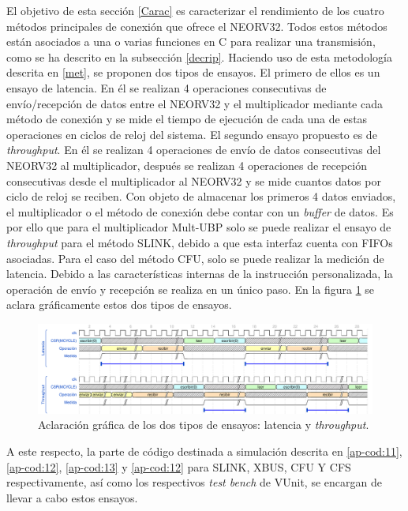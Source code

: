 El objetivo de esta sección \ref{Carac} es caracterizar el rendimiento de los cuatro métodos principales de conexión que ofrece el NEORV32.
Todos estos métodos están asociados a una o varias funciones en C para realizar una transmisión, como se ha descrito en la subsección \ref{decrip}.
Haciendo uso de esta metodología descrita en \ref{met}, se proponen dos tipos de ensayos.
El primero de ellos es un ensayo de latencia.
En él se realizan 4 operaciones consecutivas de envío/recepción de datos entre el NEORV32 y el multiplicador mediante cada método de conexión y se mide el tiempo de ejecución de cada una de estas operaciones en ciclos de reloj del sistema.
El segundo ensayo propuesto es de \textit{throughput}.
En él se realizan 4 operaciones de envío de datos consecutivas del NEORV32 al multiplicador, después se realizan 4 operaciones de recepción consecutivas desde el multiplicador al NEORV32 y se mide cuantos datos por ciclo de reloj se reciben.
Con objeto de almacenar los primeros 4 datos enviados, el multiplicador o el método de conexión debe contar con un \textit{buffer} de datos.
Es por ello que para el multiplicador Mult-UBP solo se puede realizar el ensayo de \textit{throughput} para el método SLINK, debido a que esta interfaz cuenta con FIFOs asociadas.
Para el caso del método CFU, solo se puede realizar la medición de latencia.
Debido a las características internas de la instrucción personalizada, la operación de envío y recepción se realiza en un único paso.
En la figura \ref{fig:lat-thr} se aclara gráficamente estos dos tipos de ensayos.

\begin{figure}[h!]
    \centering
    \includegraphics[width=14cm]{Figuras/wave_process.pdf}
    \caption{Aclaración gráfica de los dos tipos de ensayos: latencia y \textit{throughput}.}
    \label{fig:lat-thr}
\end{figure}

A este respecto, la parte de código destinada a simulación descrita en \ref{ap-cod:11}, \ref{ap-cod:12}, \ref{ap-cod:13} y \ref{ap-cod:12} para SLINK, XBUS, CFU Y CFS respectivamente, así como los respectivos \textit{test bench} de VUnit, se encargan de llevar a cabo estos ensayos.

